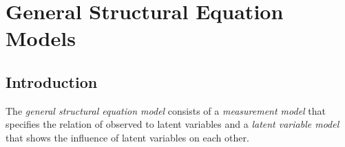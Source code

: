 

\listoftables

\vspace*{8ex}


\endgroup

\cleardoublepage
{} %

\cleardoublepage %




\chapter{General Structural Equation Models}

\minitoc

\section{Introduction}


The \emph{general structural equation model} consists of a \emph{measurement model} that specifies the relation of observed to latent variables and a \emph{latent variable model} that
shows the influence of latent variables on each other.

